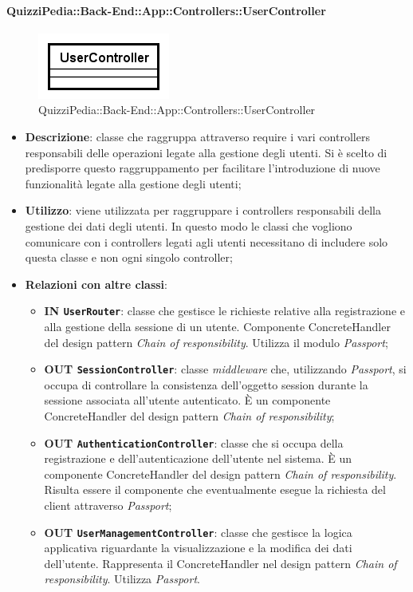 \paragraph{QuizziPedia::Back-End::App::Controllers::UserController}
\label{QuizziPedia::Back-End::App::Controllers::UserController_}
\begin{figure}[ht]
	\centering
	\includegraphics[scale=0.8]{UML/Classi/Back-End/QuizziPedia_Back-End_App_Controllers_UserController.png}
	\caption{QuizziPedia::Back-End::App::Controllers::UserController}
\end{figure}
\FloatBarrier
\begin{itemize}
	\item 
	\textbf{Descrizione}:
	classe che raggruppa attraverso require i vari controllers responsabili delle operazioni legate alla gestione degli utenti. Si è scelto di predisporre questo raggruppamento per facilitare l'introduzione di nuove funzionalità legate alla gestione degli utenti;
	\item \textbf{Utilizzo}:
	viene utilizzata per raggruppare i controllers responsabili della gestione dei dati degli utenti. In questo modo le classi che vogliono comunicare con i controllers legati agli utenti necessitano di includere solo questa classe e non ogni singolo controller;
	\item \textbf{Relazioni con altre classi}:
	\begin{itemize}
		\item 
			\textbf{IN	\texttt{UserRouter}}: 
			classe che gestisce le richieste relative alla registrazione e alla gestione della sessione di un utente. Componente ConcreteHandler del design pattern \textit{Chain of responsibility}. Utilizza il modulo \textit{Passport};		
		\item 
			\textbf{OUT \texttt{SessionController}}:
			classe \textit{middleware} che, utilizzando \textit{Passport}, si occupa di controllare la consistenza dell'oggetto session durante la sessione associata all'utente autenticato. È un componente ConcreteHandler del design pattern \textit{Chain of responsibility};
		\item 
			\textbf{OUT \texttt{AuthenticationController}}:
			classe che si occupa della registrazione e dell'autenticazione dell'utente nel sistema. È un componente ConcreteHandler del design pattern \textit{Chain of responsibility}. Risulta essere il componente che eventualmente esegue la richiesta del client attraverso \textit{Passport};	
		\item 
			\textbf{OUT \texttt{UserManagementController}}:
			classe che gestisce la logica applicativa riguardante la visualizzazione e la modifica dei dati dell'utente.
			Rappresenta il ConcreteHandler nel design pattern \textit{Chain of responsibility}. Utilizza \textit{Passport}.
	\end{itemize}
\end{itemize}
